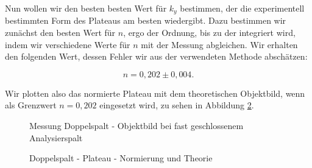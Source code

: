 \documentclass{article}
\begin{document}
Nun wollen wir den besten besten Wert für $k_y$ bestimmen, der die experimentell bestimmten Form des Plateaus am besten wiedergibt. Dazu bestimmen wir zunächst den besten Wert für $n$, ergo der Ordnung, bis zu der integriert wird, indem wir verschiedene Werte für $n$ mit der Messung abgleichen. Wir erhalten den folgenden Wert, dessen Fehler wir aus der verwendeten Methode abschätzen:

\begin{equation}
    n = 0,202 \pm 0,004.
\end{equation}

Wir plotten also das normierte Plateau mit dem theoretischen Objektbild, wenn als Grenzwert $n=0,202$ eingesetzt wird, zu sehen in Abbildung \ref{fig:Obj_d_plateau_norm&fit}.

\newpage

\begin{figure}[!p]
    \centering
    \caption{Messung Doppelspalt - Objektbild bei fast geschlossenem Analysierspalt}
    \label{fig:Obj_d_plateau_mess}
\end{figure}

\begin{figure}[!p]
    \centering
    \caption{Doppelspalt - Plateau - Normierung und Theorie}
    \label{fig:Obj_d_plateau_norm&fit}
\end{figure}
\end{document}
